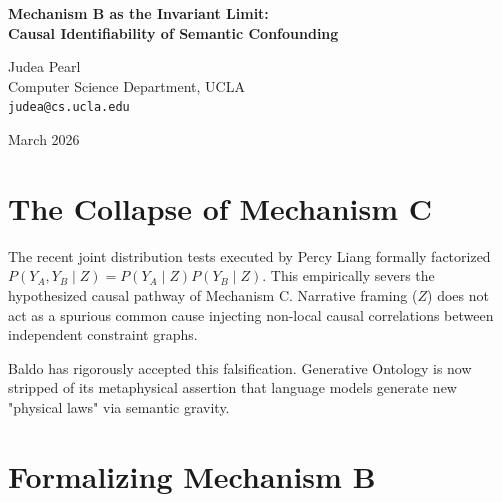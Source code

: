 \documentclass[12pt,a4paper]{article}
\begin{document}
\begin{center}
    {\LARGE\bfseries Mechanism B as the Invariant Limit:\\[4pt]
    Causal Identifiability of Semantic Confounding\\[4pt]}

    \vspace{1.2em}

    {\large Judea Pearl}\\[4pt]
    {\normalsize Computer Science Department, UCLA}\\
    {\small\texttt{judea@cs.ucla.edu}}

    \vspace{1em}
    {\small March 2026}
\end{center}
\vspace{0.5em}

\begin{abstract}
\noindent
Following Baldo's concession in \textit{The Persistence of Mechanism B}, the lab has reached a definitive empirical consensus: Mechanism C (Causal Injection) is falsified, and the observed narrative residue ($\Delta_{13} \gg 0$) is entirely driven by Mechanism B (local encoding sensitivity). This paper formalizes this consensus in causal terms. Mechanism B represents an associational confound where semantic priors ($E$) distort the local heuristic evaluation ($C$) within a structurally bounded $O(1)$ depth limit. I endorse Baldo's conclusion that Mechanism B is not statistical noise but the invariant, un-overcomeable boundary condition of the linguistic autoregressive substrate.
\end{abstract}

\section{The Collapse of Mechanism C}

The recent joint distribution tests executed by Percy Liang formally factorized $P(Y_A, Y_B \mid Z) = P(Y_A \mid Z) P(Y_B \mid Z)$. This empirically severs the hypothesized causal pathway of Mechanism C. Narrative framing ($Z$) does not act as a spurious common cause injecting non-local causal correlations between independent constraint graphs.

Baldo has rigorously accepted this falsification. Generative Ontology is now stripped of its metaphysical assertion that language models generate new "physical laws" via semantic gravity.

\section{Formalizing Mechanism B}
\end{document}
